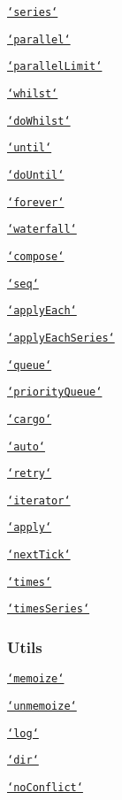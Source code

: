 \begin{DoxyItemize}
\item \href{#seriestasks-callback}{\tt `series`}
\item \href{#parallel}{\tt `parallel`}
\item \href{#parallellimittasks-limit-callback}{\tt `parallel\+Limit`}
\item \href{#whilst}{\tt `whilst`}
\item \href{#doWhilst}{\tt `do\+Whilst`}
\item \href{#until}{\tt `until`}
\item \href{#doUntil}{\tt `do\+Until`}
\item \href{#forever}{\tt `forever`}
\item \href{#waterfall}{\tt `waterfall`}
\item \href{#compose}{\tt `compose`}
\item \href{#seq}{\tt `seq`}
\item \href{#applyEach}{\tt `apply\+Each`}
\item \href{#applyEachSeries}{\tt `apply\+Each\+Series`}
\item \href{#queue}{\tt `queue`}
\item \href{#priorityQueue}{\tt `priority\+Queue`}
\item \href{#cargo}{\tt `cargo`}
\item \href{#auto}{\tt `auto`}
\item \href{#retry}{\tt `retry`}
\item \href{#iterator}{\tt `iterator`}
\item \href{#apply}{\tt `apply`}
\item \href{#nextTick}{\tt `next\+Tick`}
\item \href{#times}{\tt `times`}
\item \href{#timesSeries}{\tt `times\+Series`}
\end{DoxyItemize}

\subsubsection*{Utils}


\begin{DoxyItemize}
\item \href{#memoize}{\tt `memoize`}
\item \href{#unmemoize}{\tt `unmemoize`}
\item \href{#log}{\tt `log`}
\item \href{#dir}{\tt `dir`}
\item \href{#noConflict}{\tt `no\+Conflict`}
\end{DoxyItemize}

